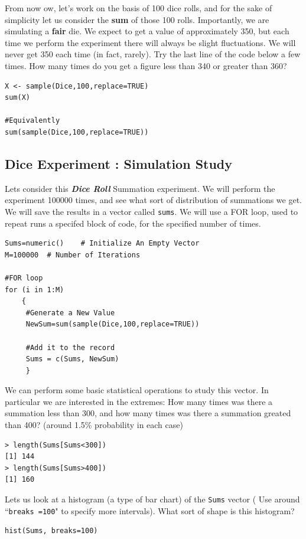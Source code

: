 \documentclass[11pt]{article} %
\begin{document}
From now ow, let's work on the basis of 100 dice rolls, and for the sake of simplicity let us consider the \textbf{sum} of those 100 rolls. Importantly, we are simulating a \textbf{fair} die. We expect to get a value of approximately 350, but each time we perform the experiment there will always be slight fluctuations. We will never get 350 each time (in fact, rarely). Try the last line of the code below a few times. How many times do you get a figure less than 340 or greater than 360?
\begin{framed}
\begin{verbatim}
X <- sample(Dice,100,replace=TRUE)
sum(X)

#Equivalently
sum(sample(Dice,100,replace=TRUE))
\end{verbatim}
\end{framed}
\newpage
\subsection{Dice Experiment : Simulation Study}
Lets consider this \textit{\textbf{Dice Roll}} Summation experiment. We will perform the experiment 100000 times, and see what sort of distribution of summations we get.
We will save the results in a vector called \texttt{sums}. We will use a FOR loop, used to repeat runs a specifed block of code, for the specified number of times. 
\begin{framed}
\begin{verbatim}
Sums=numeric()    # Initialize An Empty Vector
M=100000  # Number of Iterations

#FOR loop 
for (i in 1:M)
    {
     #Generate a New Value
     NewSum=sum(sample(Dice,100,replace=TRUE))
     
     #Add it to the record
     Sums = c(Sums, NewSum)
     }
\end{verbatim}
\end{framed}

We can perform some basic statistical operations to study this vector. In particular we are interested in the extremes: How many times was there a summation less than 300, and how many times was there a summation greated than 400? (around 1.5\% probability in each case)

\begin{verbatim}
> length(Sums[Sums<300])
[1] 144
> length(Sums[Sums>400])
[1] 160  
\end{verbatim}

Lets us look at a histogram (a type of bar chart) of the \texttt{Sums} vector ( Use around ``\texttt{breaks =100}" to specify more intervals). What sort of shape is this histogram?
\begin{framed}
\begin{verbatim}
hist(Sums, breaks=100)
\end{verbatim}
\end{framed}
\newpage
\end{document}
